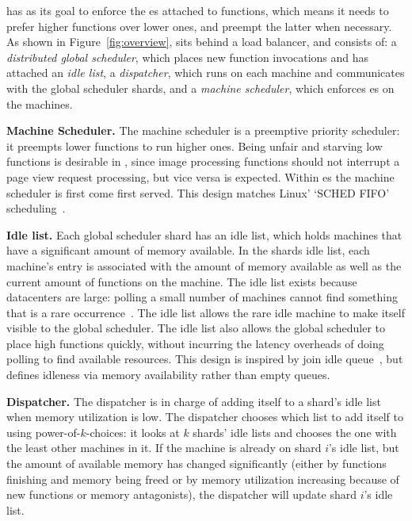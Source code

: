 \Sys{} has as its goal to enforce the \class{}es attached to
functions, which means it needs to prefer higher \class{} functions
over lower ones, and preempt the latter when necessary. As shown in
Figure~\ref{fig:overview}, \sys{} sits behind a load balancer, and
consists of: a \textit{distributed global scheduler}, which places new
function invocations and has attached an \textit{idle list}, a
\textit{dispatcher}, which runs on each machine and communicates with
the global scheduler shards, and a \textit{machine scheduler}, which
enforces \class{}es on the machines.


\textbf{Machine Scheduler.}
The machine scheduler is a preemptive priority scheduler: it preempts lower
\class{} functions to run higher \class{} ones. Being unfair and starving low
\class{} functions is desirable in \sys{}, since image processing functions
should not interrupt a page view request processing, but vice versa is expected.
Within \class{}es the machine scheduler is first come first served. This design
matches Linux' `SCHED FIFO' scheduling~\cite{linux-sched}.


\textbf{Idle list.}  Each global scheduler shard has an idle list,
which holds machines that have a significant amount of memory
available. In the shards idle list, each machine's entry is associated
with the amount of memory available as well as the current amount of
functions on the machine. The idle list exists because datacenters are
large: polling a small number of machines cannot find something that
is a rare occurrence~\cite{join-idle-queue}. The idle list allows the
rare idle machine to make itself visible to the global scheduler. The
idle list also allows the global scheduler to place high \class{}
functions quickly, without incurring the latency overheads of doing
polling to find available resources. This design is inspired by join
idle queue~\cite{join-idle-queue}, but defines idleness via memory
availability rather than empty queues.


\textbf{Dispatcher.}
The dispatcher is in charge of adding itself to a shard's idle list when memory
utilization is low. The dispatcher chooses which list to add itself to using
power-of-$k$-choices: it looks at $k$ shards' idle lists and chooses the one with
the least other machines in it. If the machine is already on shard $i$'s idle
list, but the amount of available memory has changed significantly (either by
functions finishing and memory being freed or by memory utilization increasing
because of new functions or memory antagonists), the dispatcher will update
shard $i$'s idle list.

